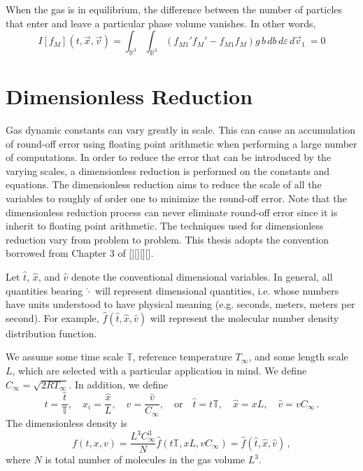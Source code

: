 \documentclass[12pt]{CSUNthesis}
\def\T{\mathbb{T}}
\def\R{\mathbb{R}}
\newcommand{\Tref}{T_{\infty}}
\newcommand{\Cref}{C_{\infty}}
\def\T{\mathbb{T}}
\def\R{\mathbb{R}}
\newcommand{\vecx}{\vec{x}}
\newcommand{\vecv}{\vec{v}}
\begin{document}
When the gas is in equilibrium, the difference between the number of particles that enter and leave a particular phase volume vanishes. In other words, 
\begin{equation*}
I[f_M](t,\vecx,\vecv) = \int_{\R^3} \int_{\R^3} (f_{M1}'f_M' - f_{M1} f_M)  g\, b\, db\, d\varepsilon\, d\vecv_1\ = 0
\end{equation*}

\section{Dimensionless Reduction}

Gas dynamic constants can vary greatly in scale. This can cause an accumulation of round-off error using floating point arithmetic when performing a large number of computations. In order to reduce the error that can be introduced by the varying scales, a dimensionless reduction is performed on the constants and equations. The dimensionless reduction aims to reduce the scale of all the variables to roughly of order one to minimize the round-off error. Note that the dimensionless reduction process can never eliminate round-off error since it is inherit to floating point arithmetic. The techniques used for dimensionless reduction vary from problem to problem. This thesis adopts the convention borrowed from Chapter 3 of [][][][].

Let $\hat{t}$, $\hat{x}$, and $\hat{v}$ denote the conventional dimensional variables. In general, all quantities bearing $\hat{\cdot}$ will represent dimensional quantities, i.e. whose numbers have units understood to have physical meaning (e.g. seconds, meters, meters per second). For example, $\hat{f}(\hat{t},\hat{x},\hat{v})$ will represent the molecular number density distribution function.

We assume some time scale $\mathbb{T}$, reference temperature $\Tref$, and some length scale $L$, which are selected with a particular application in mind. We define $\Cref = \sqrt{2R\Tref}$. In addition, we define
\begin{equation}
\label{eq:new_dimless}
t=\frac{\hat{t}}{\T},
\quad x_{i}=\frac{\hat{x}}{L},
\quad v=\frac{\hat{v}}{C_{\infty}}, 
\quad \mbox{or}
\quad \hat{t}=t\T,
\quad \hat{x}=x L,
\quad \hat{v}=vC_{\infty}\, .
\end{equation}
The dimensionless density is
\begin{equation}
f(t,x,v) = \frac{L^3 \Cref^3}{N} \hat{f}(t\mathbb{T},xL, v\Cref) = \hat{f}(\hat{t},\hat{x},\hat{v})\, ,
\end{equation}
where $N$ is total number of molecules in the gas volume $L^3$. 
\end{document}
